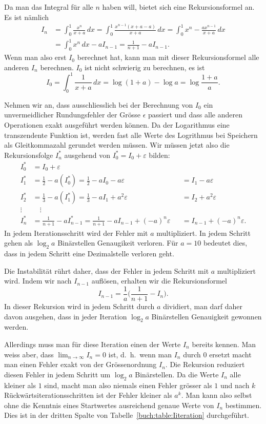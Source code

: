Da man das Integral für alle $n$ haben will, bietet sich eine
Rekursionsformel an.
Es ist nämlich
\begin{align*}
I_n
&=
\int_0^1 \frac{x^n}{x+a}\,dx
=
\int_0^1 \frac{x^{n-1}(x+a-a)}{x+a}\,dx
=
\int_0^1 x^n - \frac{ax^{n-1}}{x+a}\,dx
\\
&=
\int_0^1 x^n\,dx - aI_{n-1}
=
\frac1{n+1} - a I_{n-1}.
\end{align*}
Wenn man also erst $I_0$ berechnet hat, kann man mit dieser 
Rekursionsformel alle anderen $I_n$ berechnen.
$I_0$ ist nicht schwierig zu berechnen, es ist
\[
I_0 = \int_0^1 \frac{1}{x+a}\,dx = \log(1+a) - \log a = \log\frac{1+a}a.
\]

Nehmen wir an, dass ausschliesslich bei der Berechnung von $I_0$ ein
unvermeidlicher Rundungsfehler der Grösse $\epsilon$ passiert und dass
alle anderen Operationen exakt ausgeführt werden können.
Da der Logarithmus eine transzendente Funktion ist, werden fast alle Werte
des Logrithmus bei Speichern als Gleitkommazahl gerundet werden müssen.
Wir müssen jetzt also die Rekursionsfolge $I^*_n$ ausgehend von
$I_0^* = I_0+\varepsilon$
bilden:
\[
\begin{aligned}
I_0^* &= I_0 + \varepsilon
\\
I_1^* &= \frac12 - a(I_0^*) = \frac12-aI_0 - a\varepsilon
      &&=I_1 - a \varepsilon
\\
I_2^* &= \frac13 - a(I_1^*) = \frac13-aI_1 + a^2\varepsilon
      &&=I_2 + a^2 \varepsilon
\\
\vdots\;&\quad\vdots\\
I_n^* &= \frac{1}{n+1} -aI_{n-1}^* = \frac{1}{n+1} - aI_{n-1} + (-a)^n\varepsilon
      &&= I_{n-1} + (-a)^n\varepsilon.
\end{aligned}
\]
In jedem Iterationsschritt wird der Fehler mit $a$ multipliziert.
In jedem Schritt gehen als $\log_2a$ Binärstellen Genaugikeit verloren.
Für $a=10$ bedeutet dies, dass in jedem Schritt eine Dezimalstelle
verloren geht.

Die Instabilität rührt daher, dass der Fehler in jedem Schritt mit
$a$ multipliziert wird.
Indem wir nach $I_{n-1}$ auflösen, erhalten wir die Rekursionsformel
\[
I_{n-1} = \frac1{a} \biggl(
\frac{1}{n+1} -I_n\biggr).
\]
In dieser Rekursion wird in jedem Schritt durch $a$ dividiert, man
darf daher davon ausgehen, dass in jeder Iteration 
$\log_2a$ Binärstellen Genauigkeit gewonnen werden.

Allerdings muss man für diese Iteration einen der Werte $I_n$ bereits
kennen.
Man weiss aber, dass $\lim_{n\to\infty} I_n=0$ ist, d.~h.~wenn man
$I_n$ durch $0$ ersetzt macht man einen Fehler exakt von der
Grössenordnung $I_n$.
Die Rekursion reduziert diesen Fehler in jedem Schritt um $\log_2a$
Binärstellen.
Da die Werte $I_n$ alle kleiner als $1$ sind, macht man also
niemals einen Fehler grösser als $1$ und nach $k$ Rückwärtsiterationsschritten
ist der Fehler kleiner als $a^k$.
Man kann also selbst ohne die Kenntnis eines Startwertes ausreichend
genaue Werte von $I_n$ bestimmen.
Dies ist in der dritten Spalte von Tabelle~\ref{buch:table:Iiteration}
durchgeführt.





